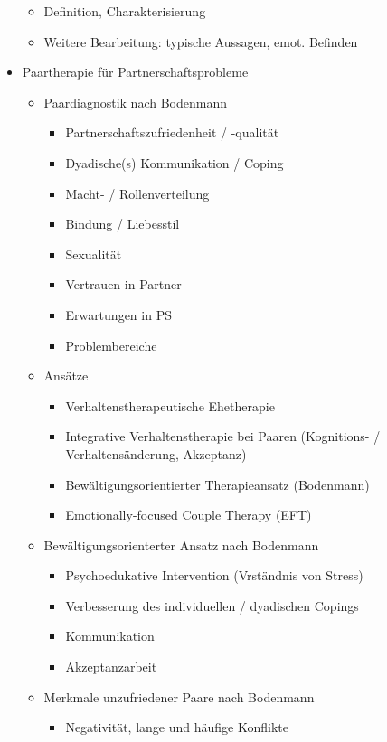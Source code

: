 \documentclass[11pt, paper=a4, twocolumn]{scrartcl}
\begin{document}
\begin{itemize}
\begin{itemize}
					\item Definition, Charakterisierung
					\item Weitere Bearbeitung: typische Aussagen, emot. Befinden
				\end{itemize}
			\item Paartherapie für Partnerschaftsprobleme
				\begin{itemize}
					\item Paardiagnostik nach Bodenmann
						\begin{itemize}
							\item Partnerschaftszufriedenheit / -qualität
							\item Dyadische(s) Kommunikation / Coping
							\item Macht- / Rollenverteilung
							\item Bindung / Liebesstil
							\item Sexualität
							\item Vertrauen in Partner
							\item Erwartungen in PS
							\item Problembereiche
						\end{itemize}
					\item Ansätze
						\begin{itemize}
							\item Verhaltenstherapeutische Ehetherapie
							\item Integrative Verhaltenstherapie bei Paaren (Kognitions- / Verhaltensänderung, Akzeptanz)
							\item Bewältigungsorientierter Therapieansatz (Bodenmann)
							\item Emotionally-focused Couple Therapy (EFT)
						\end{itemize}
					\item Bewältigungsorienterter Ansatz nach Bodenmann
						\begin{itemize}
							\item Psychoedukative Intervention (Vrständnis von Stress)
							\item Verbesserung des individuellen / dyadischen Copings
							\item Kommunikation
							\item Akzeptanzarbeit
						\end{itemize}
					\item Merkmale unzufriedener Paare nach Bodenmann
						\begin{itemize}
							\item Negativität, lange und häufige Konflikte

\end{itemize}
\end{itemize}
\end{itemize}
\end{document}
